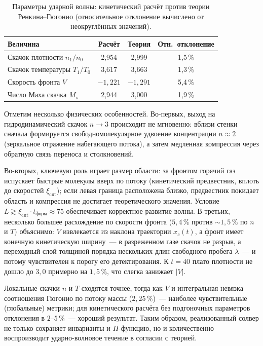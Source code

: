 \documentclass[14pt,a4paper]{extreport}
\numberwithin{equation}{chapter}
\numberwithin{figure}{chapter}
\numberwithin{table}{chapter}
\begin{document}
\begin{table}[htbp]
    \centering
\caption{Параметры ударной волны: кинетический расчёт против теории Ренкина--Гюгонио (относительное отклонение вычислено
от неокруглённых значений).}
    \label{tab:hugoniot}
    \begin{tabular}{lccc}
        \hline
        Величина                     & Расчёт     & Теория     & Отн.~отклонение \\
        \hline
        Скачок плотности $n_1/n_0$   & 2,954      & 2,999      & 1,5\,\%         \\
        Скачок температуры $T_1/T_0$ & 3,617      & 3,663      & 1,3\,\%         \\
        Скорость фронта $V$          & $-1{,}221$ & $-1{,}291$ & 5,4\,\%         \\
        Число Маха скачка $M_s$      & 2,944      & 3,000      & 1,9\,\%         \\
        \hline
    \end{tabular}
\end{table}

Отметим несколько физических особенностей.
Во-первых, выход на гидродинамический скачок $n\to3$ происходит не мгновенно: вблизи стенки сначала формируется
свободномолекулярное удвоение концентрации $n\approx2$ (зеркальное отражение набегающего потока), а затем медленная
компрессия через обратную связь переноса и столкновений.

Во-вторых, ключевую роль играет размер области: за фронтом горячий газ испускает быстрые молекулы вверх по потоку
(кинетический предвестник, вплоть до скоростей $\xi_{\mathrm{cut}}$); если левая граница расположена близко, предвестник
покидает область и компрессия не достигает теоретического значения.
Условие $L\gtrsim\xi_{\mathrm{cut}}\cdot t_{\text{форм}}\approx75$ обеспечивает корректное развитие волны.
В-третьих, несколько большее расхождение по скорости фронта ($5{,}4\,\%$ против $\sim1{,}5\,\%$ по $n$ и $T$) объяснимо:
$V$ извлекается из наклона траектории $x_c(t)$, а фронт имеет конечную кинетическую ширину~--- в разреженном газе скачок
не разрыв, а переходный слой толщиной порядка нескольких длин свободного пробега $\lambda$~--- и потому чувствителен к
порогу его детектирования.
К $t=40$ плато плотности не дошло до $3{,}0$ примерно на $1{,}5\,\%$, что слегка занижает $|V|$.

Локальные скачки $n$ и $T$ сходятся точнее, тогда как $V$ и интегральная невязка соотношения Гюгонио по потоку массы
($2{,}25\,\%$)~--- наиболее чувствительные (глобальные) метрики; для кинетического расчёта без подгоночных параметров
отклонения в $2$--$5\,\%$~--- хороший результат.
Таким образом, реализованный солвер не только сохраняет инварианты и $H$-функцию, но и количественно воспроизводит
ударно-волновое течение в согласии с теорией.
\end{document}
